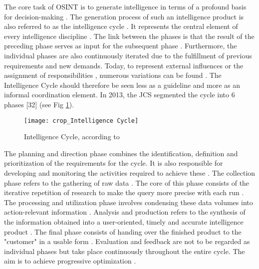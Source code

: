 \documentclass[10pt]{article}
\begin{document}
The core task of OSINT is to generate intelligence \cite{Hwang.2022,Dokman.2020}
in terms of a profound basis for decision-making
\cite{Breakspear.2013,May.2020}. The generation process of such an intelligence product
is also referred to as the intelligence cycle \cite{HerreraCubides.2020, CentralIntelligenceAgency.1987}.
It represents the central element of every intelligence discipline \cite{Reuser.2017,Dokman.2020}. The link between the phases is that
the result of the preceding phase serves as input for the subsequent phase
\cite{JointChiefsofStaffU.S.Army.2013,Pellissier.2013}. Furthermore, the individual phases are also continuously
iterated due to the fulfillment of previous requirements and new demands\cite{Gibson.2016}.
Today, to represent external influences or the
assignment of responsibilities \cite{Lowenthal.2020,Phythian.2013,Johnston.2005}, numerous
variations can be found \cite{Bohm.2021,Reuser.2017}. The
Intelligence Cycle should therefore be seen less as a guideline and more as an informal
coordination element\cite{Hwang.2022}.
In 2013, the JCS segmented the cycle into 6 phases [32] (see Fig \ref{fig: intelligence cycle}).

\begin{figure}[h]
    \centering
    \texttt{[image: crop\_Intelligence Cycle]}
    \caption{Intelligence Cycle, according to \cite{JointChiefsofStaffU.S.Army.2013}}
    \label{fig: intelligence cycle}
\end{figure}

The planning and direction phase combines the identification, definition and prioritization
of the requirements for the cycle. It is also responsible for developing and monitoring the activities
required to achieve these \cite{DepartmentoftheArmy.2012}
\cite{JointChiefsofStaffU.S.Army.2013, DepartmentoftheArmy.2012}.
The collection phase refers to the gathering of raw data \cite{CentralIntelligenceAgency.1987}.
The core of this phase consists of the iterative repetition of research
\cite{NorthAtlanticTreatyOrganization.2001} to make the query more precise with each run
\cite{PastorGalindo.2020}. The processing and utilization phase involves condensing
these data volumes into action-relevant information
\cite{DirectorofNationalIntelligence.2011, JointChiefsofStaffU.S.Army.2013, PastorGalindo.2020}.
Analysis and production refers to the synthesis of the information obtained into a
user-oriented, timely and accurate intelligence product
\cite{DepartmentoftheArmy.2012, Hwang.2022, NorthAtlanticTreatyOrganization.2001}.
The final phase consists of handing over the finished product to the "customer" in a
usable form \cite{CentralIntelligenceAgency.2023, DepartmentoftheArmy.2012, Williams.2018}.
Evaluation and feedback are not to be regarded as individual phases
but take place continuously throughout the entire cycle. The aim is to achieve progressive optimization
\cite{DirectorofNationalIntelligence.2011, JointChiefsofStaffU.S.Army.2013, NorthAtlanticTreatyOrganization.2001}.
\end{document}
